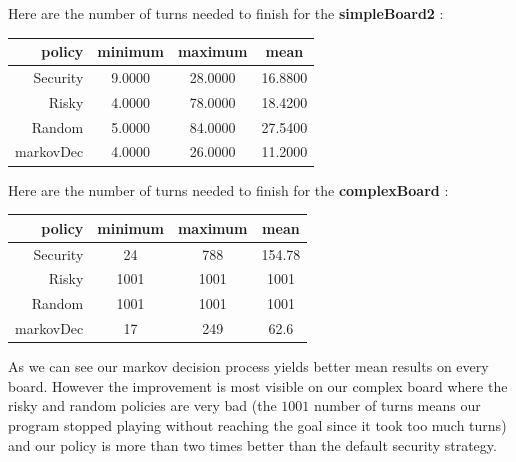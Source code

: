 \documentclass{eplDoc}
\begin{document}
Here are the number of turns needed to finish for the \textbf{simpleBoard2} : 


\begin{center}
		\begin{tabular}{|r|ccc|}
			\hline
			policy & minimum & maximum & mean \\ 
			\hline
			 Security &     9.0000  & 28.0000  & 16.8800 \\
    Risky & 4.0000  & 78.0000 &  18.4200 \\ 
    Random & 5.0000  & 84.0000 &  27.5400 \\ 
    markovDec & 4.0000 &  26.0000  & 11.2000  \\ 
   		\hline
		\end{tabular}
\end{center}

Here are the number of turns needed to finish for the \textbf{complexBoard} : 


\begin{center}
		\begin{tabular}{|r|ccc|}
			\hline  
			policy & minimum & maximum & mean \\ 
			\hline
			 Security &                            24          &             788         &           154.78 \\
       Risky &               1001           &           1001          &            1001 \\ 
       Random &               1001        &             1001             &         1001 \\ 
       markovDec &                 17         &              249             &         62.6 \\ 
 
   		\hline
		\end{tabular}
\end{center}

As we can see our markov decision process yields better mean results on every board. However the improvement is most visible on our complex board where the risky and random policies are very bad (the $1001$ number of turns means our program stopped playing without reaching the goal since it took too much turns) and our policy is more than two times better than the default security strategy. 
\end{document}
